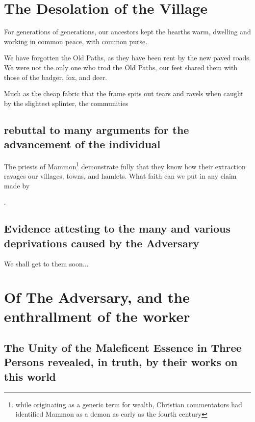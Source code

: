 \documentclass[10pt]{book}
\begin{document}
\section[The Desolation of the Village]{The Desolation of the Village}

For generations of generations, our ancestors kept the hearths warm, dwelling and working in common peace, with common purse.

We have forgotten the Old Paths, as they have been rent by the new paved roads. We were not the only one who trod the Old Paths, our feet shared them with those of the badger, fox, and deer.

Much as the cheap fabric that the frame spits out tears and ravels when caught by the slightest splinter, the communities 

\subsection{rebuttal to many arguments for the advancement of the individual}

The priests of Mammon\footnote{while originating as a generic term for wealth, Christian commentators had identified Mammon as a demon as early as the fourth century} demonstrate fully that they know how their extraction ravages our villages, towns, and hamlets. What faith can we put in any claim made by  

.

\subsection{Evidence attesting to the many and various deprivations caused by the Adversary}

We shall get to them soon...

\section[Of the Adversary]{Of The Adversary, and the enthrallment of the worker}
\subsection{The Unity of the Maleficent Essence in Three Persons revealed, in truth, by their works on this world}
\end{document}
